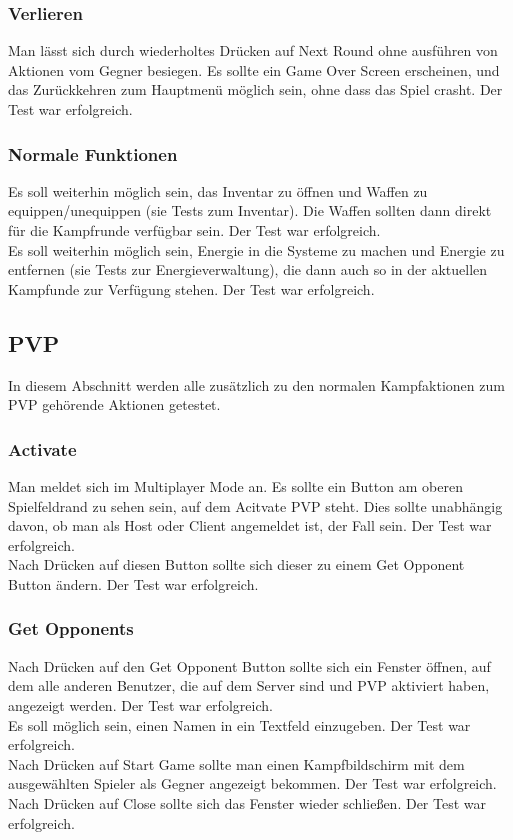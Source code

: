 \documentclass[fontsize=12pt,paper=a4,twoside]{scrartcl}
\begin{document}
\subsubsection{Verlieren}
Man lässt sich durch wiederholtes Drücken auf Next Round ohne ausführen von Aktionen vom Gegner besiegen. Es sollte ein Game Over Screen erscheinen, und das Zurückkehren zum Hauptmenü möglich sein, ohne dass das Spiel crasht.  Der Test war erfolgreich. \\
\subsubsection{Normale Funktionen} 
Es soll weiterhin möglich sein, das Inventar zu öffnen und Waffen zu equippen/unequippen (sie Tests zum Inventar). Die Waffen sollten dann direkt für die Kampfrunde verfügbar sein. Der Test war erfolgreich. \\
Es soll weiterhin möglich sein, Energie in die Systeme zu machen und Energie zu entfernen (sie Tests zur Energieverwaltung), die dann auch so in der aktuellen Kampfunde zur Verfügung stehen. Der Test war erfolgreich. \\

\subsection{PVP}
In diesem Abschnitt werden alle zusätzlich zu den normalen Kampfaktionen zum PVP gehörende Aktionen getestet. \\
\subsubsection{Activate}
Man meldet sich im Multiplayer Mode an. Es sollte ein Button am oberen Spielfeldrand zu sehen sein, auf dem Acitvate PVP steht. Dies sollte unabhängig davon, ob man als Host oder Client angemeldet ist, der Fall sein. Der Test war erfolgreich. \\
Nach Drücken auf diesen Button sollte sich dieser zu einem Get Opponent Button ändern.  Der Test war erfolgreich. \\
\subsubsection{Get Opponents}
Nach Drücken auf den Get Opponent Button sollte sich ein Fenster öffnen, auf dem alle anderen Benutzer, die auf dem Server sind und PVP aktiviert haben, angezeigt werden.  Der Test war erfolgreich. \\
Es soll möglich sein, einen Namen in ein Textfeld einzugeben.  Der Test war erfolgreich. \\
Nach Drücken auf Start Game sollte man einen Kampfbildschirm mit dem ausgewählten Spieler als Gegner angezeigt bekommen.  Der Test war erfolgreich. \\
Nach Drücken auf Close sollte sich das Fenster wieder schließen.  Der Test war erfolgreich. \\
\end{document}
